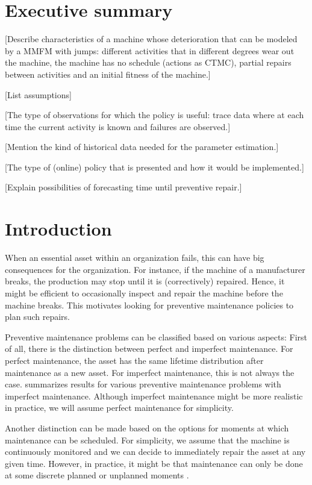 \documentclass[a4paper]{thesis}
\theoremstyle{definition}
\begin{document}
\chapter*{Executive summary}
[Describe characteristics of a machine whose deterioration that can be modeled by a MMFM with jumps: different activities that in different degrees wear out the machine, the machine has no schedule (actions as CTMC), partial repairs between activities and an initial fitness of the machine.]

[List assumptions]

[The type of observations for which the policy is useful: trace data where at each time the current activity is known and failures are observed.]

[Mention the kind of historical data needed for the parameter estimation.]

[The type of (online) policy that is presented and how it would be implemented.]

[Explain possibilities of forecasting time until preventive repair.]

\tableofcontents

\chapter{Introduction}\label{chapter:Introduction}
When an essential asset within an organization fails, this can have big consequences for the organization.
For instance, if the machine of a manufacturer breaks, the production may stop until it is (correctively) repaired.
Hence, it might be efficient to occasionally inspect and repair the machine before the machine breaks.
This motivates looking for preventive maintenance policies to plan such repairs.

Preventive maintenance problems can be classified based on various aspects:
First of all, there is the distinction between perfect and imperfect maintenance.
For perfect maintenance, the asset has the same lifetime distribution after maintenance as a new asset.
For imperfect maintenance, this is not always the case.
\cite{Pham1996} summarizes results for various preventive maintenance problems with imperfect maintenance.
Although imperfect maintenance might be more realistic in practice, we will assume perfect maintenance for simplicity.

Another distinction can be made based on the options for moments at which maintenance can be scheduled.
For simplicity, we assume that the machine is continuously monitored and we can decide to immediately repair the asset at any given time.
However, in practice, it might be that maintenance can only be done at some discrete planned or unplanned moments \cite{Kalosi2016}.
\end{document}
